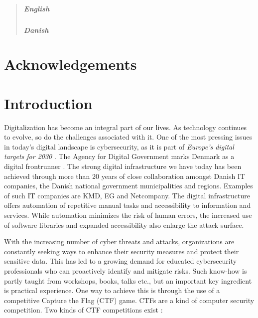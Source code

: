 \begin{abstract}
\paragraph{English}

\paragraph{Danish}
\end{abstract}

\chapter*{Acknowledgements}
\thispagestyle{empty}
\clearpage


{ \hypersetup{hidelinks} \tableofcontents {}}

\newpage
{}
\setcounter{page}{1}

\chapter{Introduction}
Digitalization has become an integral part of our lives. As technology continues to evolve, so do the challenges associated with it. One of the most pressing issues in today's digital landscape is cybersecurity, as it is part of \textit{Europe's digital targets for 2030} \Parencite{europe_digital_decade}. The Agency for Digital Government marks Denmark as a digital frontrunner \Parencite{danish_digital_journey}. The strong digital infrastructure we have today has been achieved through more than 20 years of close collaboration amongst Danish IT companies, the Danish national government municipalities and regions. Examples of such IT companies are KMD, EG and Netcompany. The digital infrastructure offers automation of repetitive manual tasks and accessibility to information and services. While automation minimizes the risk of human errors, the increased use of software libraries and expanded accessibility also enlarge the attack surface.

With the increasing number of cyber threats and attacks, organizations are constantly seeking ways to enhance their security measures and protect their sensitive data. This has led to a growing demand for educated cybersecurity professionals who can proactively identify and mitigate risks. Such know-how is partly taught from workshops, books, talks etc., but an important key ingredient is practical experience. One way to achieve this is through the use of a competitive Capture the Flag (CTF) game. CTFs are a kind of computer security competition. Two kinds of CTF competitions exist \Parencite{ctf_overview}: 


